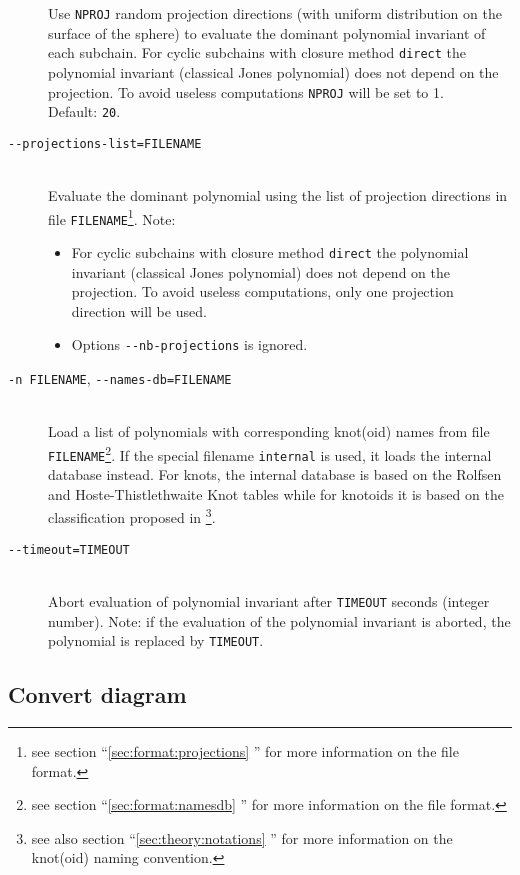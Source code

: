 \begin{description}
  Use \lstinline{NPROJ} random projection directions (with uniform distribution on the surface of the sphere) to evaluate the dominant polynomial invariant of each subchain.  For cyclic subchains with closure method \lstinline{direct} the polynomial invariant (classical Jones polynomial) does not depend on the projection. To avoid useless computations \lstinline{NPROJ} will be set to 1.\\
  Default: \lstinline{20}.
\item[\lstinline{--projections-list=FILENAME}]\hfill\\
 Evaluate the dominant polynomial using the list of projection directions in file \lstinline{FILENAME}\footnote{see section ``\ref{sec:format:projections} ''  for more information on the file format.}. Note:
  \begin{itemize}
    \item For cyclic subchains with closure method \lstinline{direct} the polynomial invariant (classical Jones polynomial) does not depend on the projection. To avoid useless computations, only one projection direction will be used.
    \item Options  \lstinline{--nb-projections} is ignored.                                  
  \end{itemize}
\item[\lstinline{-n FILENAME}, \lstinline{--names-db=FILENAME}]\hfill\\
  Load a list of polynomials with corresponding knot(oid) names from file \lstinline{FILENAME}\footnote{see section ``\ref{sec:format:namesdb} '' for more information on the file format.}. If the special filename \lstinline{internal} is used, it loads the internal database instead. For knots, the internal database is based on the Rolfsen and Hoste-Thistlethwaite Knot tables while for knotoids it is based on the classification proposed in \cite{goundaroulis2019}\footnote{see also section ``\ref{sec:theory:notations} '' for more information on the knot(oid) naming convention.}.
\item[\lstinline{--timeout=TIMEOUT}]\hfill\\
  Abort evaluation of polynomial invariant after \lstinline{TIMEOUT} seconds (integer number). Note: if the evaluation of the polynomial invariant is aborted, the polynomial is replaced by \lstinline{TIMEOUT}.
\end{description}

\subsection{Convert diagram}
